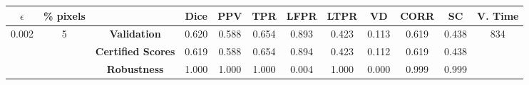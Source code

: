 \begin{longtable}{ c  c | c | c  c  c  c  c  c  c c c}
\toprule \textbf{$\epsilon$} & \textbf{\% pixels} & & \textbf{Dice} & \textbf{PPV} & \textbf{TPR} & \textbf{LFPR} & \textbf{LTPR} & \textbf{VD} & \textbf{CORR} & \textbf{SC} & \textbf{V. Time} \\
\midrule 
\multirow{3}{*}{0.002}  & \multirow{3}{*}{5} &\textbf{Validation} & 0.620 & 0.588 & 0.654 & 0.893 & 0.423 & 0.113 & 0.619 & 0.438 & \multirow{3}{*}{834} \\
 & & \textbf{Certified Scores} & 0.619 & 0.588 & 0.654 & 0.894 & 0.423 & 0.112 & 0.619 & 0.438 & \\
& & \textbf{Robustness} & 1.000 & 1.000 & 1.000 & 0.004 & 1.000 & 0.000 & 0.999 & 0.999 & \\
\end{longtable}